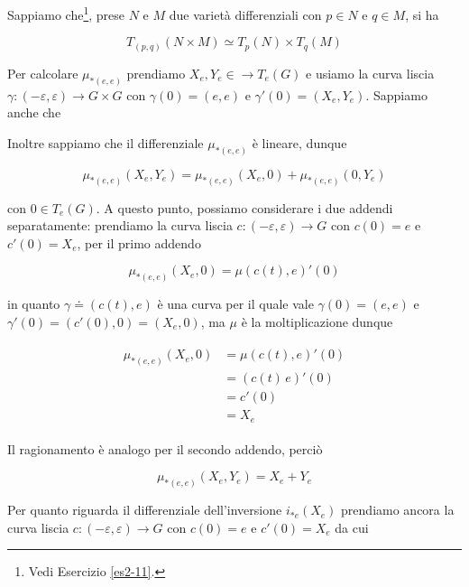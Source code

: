Sappiamo che\footnote{%
	Vedi Esercizio \ref{es2-11}.%
}, prese $ N $ e $ M $ due varietà differenziali con $ p \in N $ e $ q \in M $, si ha

\begin{equation}
	T_{(p,q)}(N \times M) \simeq T_{p}(N) \times T_{q}(M)
\end{equation}

Per calcolare $ \mu_{*(e,e)} $ prendiamo $ X_{e},Y_{e} \in \to T_{e}(G) $ e usiamo la curva liscia $ \gamma : (-\varepsilon,\varepsilon) \to G \times G $ con $ \gamma(0)=(e,e) $ e $ \gamma'(0) = (X_{e},Y_{e}) $. Sappiamo anche che

Inoltre sappiamo che il differenziale $ \mu_{*(e,e)} $ è lineare, dunque

\begin{equation}
	\mu_{*(e,e)}(X_{e},Y_{e}) = \mu_{*(e,e)}(X_{e},0) + \mu_{*(e,e)}(0,Y_{e})
\end{equation}

con $ 0 \in T_{e}(G) $. A questo punto, possiamo considerare i due addendi separatamente: prendiamo la curva liscia $ c : (-\varepsilon,\varepsilon) \to G $ con $ c(0)=e $ e $ c'(0) = X_{e} $, per il primo addendo

\begin{equation}
	\mu_{*(e,e)}(X_{e},0) = \mu(c(t),e)'(0)
\end{equation}

in quanto $ \gamma \doteq (c(t),e) $ è una curva per il quale vale $ \gamma(0) = (e,e) $ e $ \gamma'(0) = (c'(0),0) = (X_{e},0) $, ma $ \mu $ è la moltiplicazione dunque

\begin{align}
	\begin{split}
		\mu_{*(e,e)}(X_{e},0) &= \mu(c(t),e)'(0)\\
		&= (c(t) \, e)'(0)\\
		&= c'(0)\\
		&= X_{e}
	\end{split}
\end{align}

Il ragionamento è analogo per il secondo addendo, perciò

\begin{equation}
	\mu_{*(e,e)}(X_{e},Y_{e}) = X_{e} + Y_{e}
\end{equation}

Per quanto riguarda il differenziale dell'inversione $ i_{*e}(X_{e}) $ prendiamo ancora la curva liscia $ c : (-\varepsilon,\varepsilon) \to G $ con $ c(0)=e $ e $ c'(0) = X_{e} $ da cui

